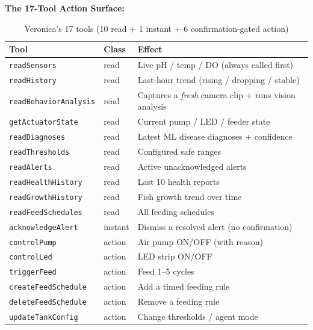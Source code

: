 \documentclass[12pt,a4paper,oneside]{article}
\begin{document}
\textbf{The 17-Tool Action Surface:}
\begin{table}[H]
    \centering
    \begin{tabularx}{\textwidth}{lll}
        \toprule
        \textbf{Tool} & \textbf{Class} & \textbf{Effect} \\
        \midrule
        \texttt{readSensors} & read & Live pH / temp / DO (always called first) \\
        \texttt{readHistory} & read & Last-hour trend (rising / dropping / stable) \\
        \texttt{readBehaviorAnalysis} & read & Captures a \emph{fresh} camera clip + runs vision analysis \\
        \texttt{getActuatorState} & read & Current pump / LED / feeder state \\
        \texttt{readDiagnoses} & read & Latest ML disease diagnoses + confidence \\
        \texttt{readThresholds} & read & Configured safe ranges \\
        \texttt{readAlerts} & read & Active unacknowledged alerts \\
        \texttt{readHealthHistory} & read & Last 10 health reports \\
        \texttt{readGrowthHistory} & read & Fish growth trend over time \\
        \texttt{readFeedSchedules} & read & All feeding schedules \\
        \texttt{acknowledgeAlert} & instant & Dismiss a resolved alert (no confirmation) \\
        \texttt{controlPump} & action & Air pump ON/OFF (with reason) \\
        \texttt{controlLed} & action & LED strip ON/OFF \\
        \texttt{triggerFeed} & action & Feed 1--5 cycles \\
        \texttt{createFeedSchedule} & action & Add a timed feeding rule \\
        \texttt{deleteFeedSchedule} & action & Remove a feeding rule \\
        \texttt{updateTankConfig} & action & Change thresholds / agent mode \\
        \bottomrule
    \end{tabularx}
    \caption{Veronica's 17 tools (10 read + 1 instant + 6 confirmation-gated action)}
\end{table}
\end{document}
